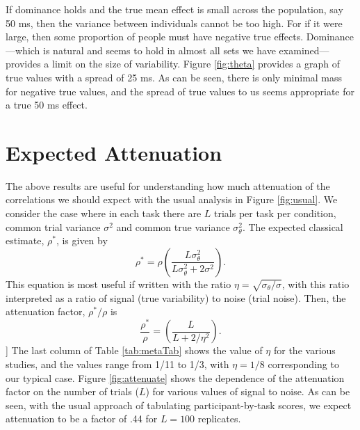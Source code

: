 \documentclass[
  english,
  ,man]{apa6}
\begin{document}
If dominance holds and the true mean effect is small across the population, say 50 ms, then the variance between individuals cannot be too high. For if it were large, then some proportion of people must have negative true effects. Dominance---which is natural and seems to hold in almost all sets we have examined---provides a limit on the size of variability. Figure \ref{fig:theta} provides a graph of true values with a spread of 25 ms. As can be seen, there is only minimal mass for negative true values, and the spread of true values to us seems appropriate for a true 50 ms effect.

\hypertarget{expected-attenuation}{%
\section{Expected Attenuation}\label{expected-attenuation}}

The above results are useful for understanding how much attenuation of the correlations we should expect with the usual analysis in Figure \ref{fig:usual}. We consider the case where in each task there are \(L\) trials per task per condition, common trial variance \(\sigma^2\) and common true variance \(\sigma^2_\theta\). The expected classical estimate, \(\rho^*\), is given by
\[
\rho^* = \rho\left(\frac{L\sigma^2_\theta}{L\sigma^2_\theta+2\sigma^2}\right).
\]
This equation is most useful if written with the ratio \(\eta=\sqrt{\sigma_\theta/ \sigma}\), with this ratio interpreted as a ratio of signal (true variability) to noise (trial noise). Then, the attenuation factor, \(\rho^*/\rho\) is
\begin{equation} \label{eq:fid}
\frac{\rho^*}{\rho} = \left( \frac{L}{L+2/\eta^2}\right).
\end{equation}
{]}
The last column of Table \ref{tab:metaTab} shows the value of \(\eta\) for the various studies, and the values range from 1/11 to 1/3, with \(\eta=1/8\) corresponding to our typical case. Figure \ref{fig:attenuate} shows the dependence of the attenuation factor on the number of trials (\(L\)) for various values of signal to noise. As can be seen, with the usual approach of tabulating participant-by-task scores, we expect attenuation to be a factor of .44 for \(L=100\) replicates.
\end{document}
